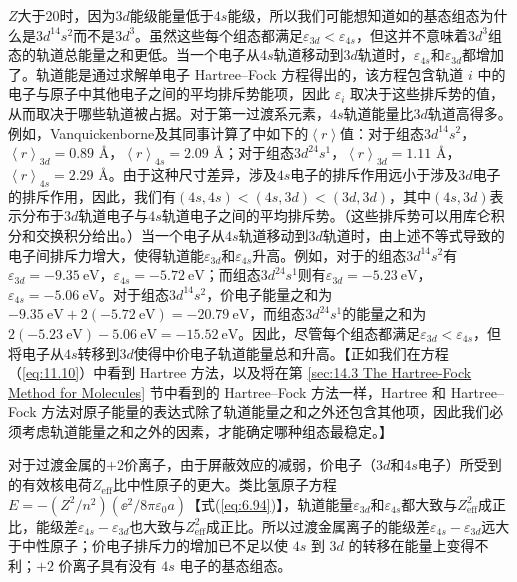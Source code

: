     $Z$大于20时，因为$3d$能级能量低于$4s$能级，所以我们可能想知道如的基态组态为什么是$3d^14s^2$而不是$3d^3$。虽然这些每个组态都满足$\varepsilon_{3d} < \varepsilon_{4s}$，但这并不意味着$3d^3$组态的轨道总能量之和更低。当一个电子从$4s$轨道移动到$3d$轨道时，$\varepsilon_{4s}$和$\varepsilon_{3d}$都增加了。轨道能是通过求解单电子 Hartree–Fock 方程得出的，该方程包含轨道 $i$ 中的电子与原子中其他电子之间的平均排斥势能项，因此 $\varepsilon_i$ 取决于这些排斥势的值，从而取决于哪些轨道被占据。对于第一过渡系元素，$4s$轨道能量比$3d$轨道高得多。例如，Vanquickenborne及其同事计算了中如下的$\left\langle r \right\rangle$值：对于组态$3d^14s^2$，$\left\langle r \right\rangle _{3d} = 0.89$ \AA，$\left\langle r \right\rangle _{4s} = 2.09$ \AA；对于组态$3d^24s^1$，$\left\langle r \right\rangle _{3d} = 1.11$ \AA，$\left\langle r \right\rangle _{4s} = 2.29$ \AA。由于这种尺寸差异，涉及$4s$电子的排斥作用远小于涉及$3d$电子的排斥作用，因此，我们有$\left(4s, 4s\right) < \left(4s, 3d\right) < \left(3d, 3d\right)$，其中$\left(4s, 3d\right)$表示分布于$3d$轨道电子与$4s$轨道电子之间的平均排斥势。（这些排斥势可以用库仑积分和交换积分给出。）当一个电子从$4s$轨道移动到$3d$轨道时，由上述不等式导致的电子间排斥力增大，使得轨道能$\varepsilon_{3d}$和$\varepsilon_{4s}$升高。例如，对于的组态$3d^14s^2$有$\varepsilon_{3d} = -9.35 \:\mathrm{eV}$，$\varepsilon_{4s} = -5.72 \:\mathrm{eV}$；而组态$3d^24s^1$则有$\varepsilon_{3d} = -5.23 \:\mathrm{eV}$，$\varepsilon_{4s} = -5.06 \:\mathrm{eV}$。对于组态$3d^14s^2$，价电子能量之和为$- 9.35 \:\mathrm{eV} + 2\left(-5.72 \:\mathrm{eV}\right) = -20.79 \:\mathrm{eV}$，而组态$3d^24s^1$的能量之和为$2\left(-5.23 \:\mathrm{eV}\right) - 5.06 \:\mathrm{eV} = -15.52 \:\mathrm{eV}$。因此，尽管每个组态都满足$\varepsilon_{3d} < \varepsilon_{4s}$，但将电子从$4s$转移到$3d$使得中价电子轨道能量总和升高。【正如我们在方程（\ref{eq:11.10}）中看到 Hartree 方法，以及将在第 \ref{sec:14.3 The Hartree-Fock Method for Molecules} 节中看到的 Hartree–Fock 方法一样，Hartree 和 Hartree–Fock 方法对原子能量的表达式除了轨道能量之和之外还包含其他项，因此我们必须考虑轨道能量之和之外的因素，才能确定哪种组态最稳定。】

    对于过渡金属的$+2$价离子，由于屏蔽效应的减弱，价电子（$3d$和$4s$电子）所受到的有效核电荷$Z_{\text{eff}}$比中性原子的更大。类比氢原子方程$E = - \left(Z^2 / n^2\right)\left(\ee ^2 / 8\pi\varepsilon_0a\right)$【式(\ref{eq:6.94})】，轨道能量$\varepsilon_{3d}$和$\varepsilon_{4s}$都大致与$Z^2_{\text{eff}}$成正比，能级差$\varepsilon_{4s} - \varepsilon_{3d}$也大致与$Z^2_{\text{eff}}$成正比。所以过渡金属离子的能级差$\varepsilon_{4s} - \varepsilon_{3d}$远大于中性原子；价电子排斥力的增加已不足以使 $4s$ 到 $3d$ 的转移在能量上变得不利；$+2$ 价离子具有没有 $4s$ 电子的基态组态。

